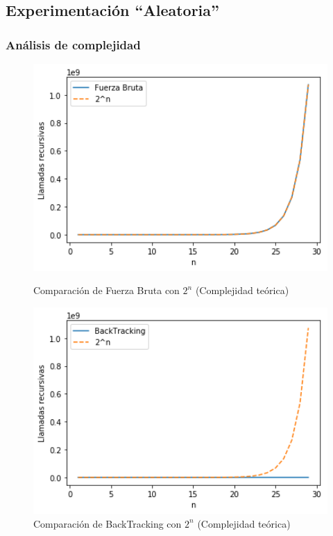 \subsection{Experimentaci\'on ``Aleatoria''}

\subsubsection{An\'alisis de complejidad}
\begin{figure}[H] 
    \centering
    \begin{minipage}{0.45\textwidth}
        \centering
        \includegraphics[width=1\textwidth]{img/complejidad/llamadasFB.png} %
        \caption{Comparaci\'on de Fuerza Bruta con $2^n$ (Complejidad te\'orica)}
        \label{fig:llamadasFB}
    \end{minipage}\hfill
    \begin{minipage}{0.45\textwidth}
        \centering
        \includegraphics[width=1\textwidth]{img/complejidad/llamadasBack.png} %
        \caption{Comparaci\'on de BackTracking con $2^n$ (Complejidad te\'orica)}
        \label{fig:llamadasBack}
    \end{minipage}\hfill
\end{figure}
